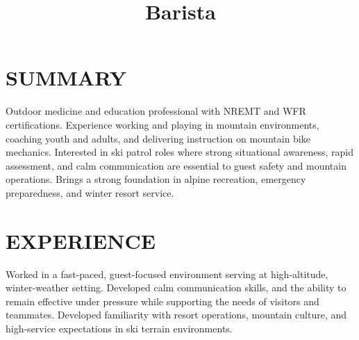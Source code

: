 \documentclass[resmargin, centered, 10pt]{../res}
\begin{document}
\address{\href{mailto:kirkwood.donavin@gmail.com}{Kirkwood.Donavin@Gmail.com}}
\address{+1 (801) 554-6834}
\address{}
\address{}
\address{}

\begin{resume}
    
\fullline

\section{SUMMARY}

Outdoor medicine and education professional with NREMT and WFR certifications. Experience working and playing in mountain environments, coaching youth and adults, and delivering instruction on mountain bike mechanics. Interested in ski patrol roles where strong situational awareness, rapid assessment, and calm communication are essential to guest safety and mountain operations. Brings a strong foundation in alpine recreation, emergency preparedness, and winter resort service.

\fullline

\section{EXPERIENCE}

\title{Barista}
\begin{position}
	Worked in a fast-paced, guest-focused environment serving at high-altitude, winter-weather setting. Developed calm communication skills, and the ability to remain effective under pressure while supporting the needs of visitors and teammates. Developed familiarity with resort operations, mountain culture, and high-service expectations in ski terrain environments.
\end{position}


\end{resume}
\end{document}
